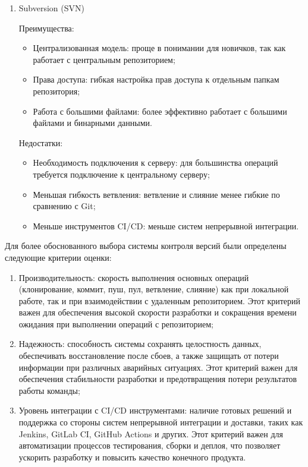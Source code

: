 \documentclass[utf8, russian]{eskdtext}
\begin{document}
\begin{enumerate}
\item Subversion (SVN)

    Преимущества:
    \begin{itemize}
        \item Централизованная модель: проще в понимании для новичков, так как работает с центральным репозиторием;
        \item Права доступа: гибкая настройка прав доступа к отдельным папкам репозитория;
        \item Работа с большими файлами: более эффективно работает с большими файлами и бинарными данными.
    \end{itemize}

    Недостатки:
    \begin{itemize}
        \item Необходимость подключения к серверу: для большинства операций требуется подключение к центральному серверу;
        \item Меньшая гибкость ветвления: ветвление и слияние менее гибкие по сравнению с Git;
        \item Меньше инструментов CI/CD: меньше систем непрерывной интеграции.
    \end{itemize}
\end{enumerate}

Для более обоснованного выбора системы контроля версий были определены следующие критерии оценки:

\begin{enumerate}
    \item {Производительность:} скорость выполнения основных операций (клонирование, коммит, пуш, пул, ветвление, слияние) как при локальной работе, так и при взаимодействии с удаленным репозиторием. Этот критерий важен для обеспечения высокой скорости разработки и сокращения времени ожидания при выполнении операций с репозиторием;
    \item {Надежность:} способность системы сохранять целостность данных, обеспечивать восстановление после сбоев, а также защищать от потери информации при различных аварийных ситуациях. Этот критерий важен для обеспечения стабильности разработки и предотвращения потери результатов работы команды;
    \item {Уровень интеграции с CI/CD инструментами:} наличие готовых решений и поддержка со стороны систем непрерывной интеграции и доставки, таких как Jenkins, GitLab CI, GitHub Actions и других. Этот критерий важен для автоматизации процессов тестирования, сборки и деплоя, что позволяет ускорить разработку и повысить качество конечного продукта.
\end{enumerate}
\end{document}
